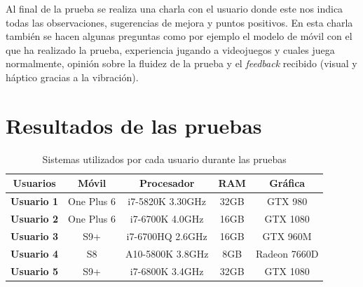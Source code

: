 Al final de la prueba se realiza una charla con el usuario donde este nos indica todas las observaciones, sugerencias de mejora y puntos positivos. En esta charla tambi\'en se hacen algunas preguntas como por ejemplo el modelo de m\'ovil con el que ha realizado la prueba, experiencia jugando a videojuegos y cuales juega normalmente, opini\'on sobre la fluidez de la prueba y el \textit{feedback} recibido (visual y h\'aptico gracias a la vibraci\'on). 

\section{Resultados de las pruebas}


\begin{table}[h]
    \begin{tabular}{ccccc}
        \toprule
         \textbf{Usuarios} & \textbf{M\'ovil} & \textbf{Procesador} & \textbf{RAM} & \textbf{Gr\'afica} \\
        \midrule
\textbf{Usuario 1} & One Plus 6 & i7-5820K 3.30GHz & 32GB &  GTX 980\\
\textbf{Usuario 2} & One Plus 6 & i7-6700K 4.0GHz & 16GB &  GTX 1080 \\
\textbf{Usuario 3} & S9+ & i7-6700HQ 2.6GHz & 16GB &  GTX 960M \\
\textbf{Usuario 4} & S8 & A10-5800K 3.8GHz & 8GB & Radeon 7660D \\
\textbf{Usuario 5} & S9+ & i7-6800K 3.4GHz & 32GB &  GTX 1080 \\
        \bottomrule
    \end{tabular}
\caption{Sistemas utilizados por cada usuario durante las pruebas}
\label{tablausuarios}
\end{table}


